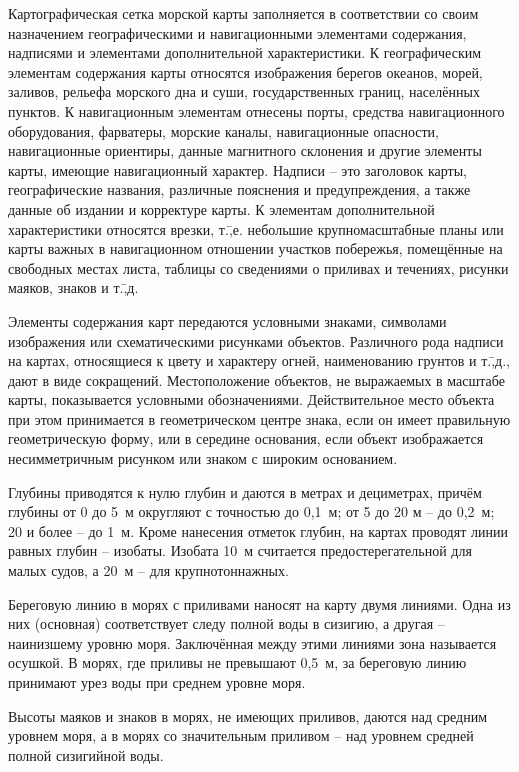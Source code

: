 Картографическая сетка морской карты заполняется в соответствии со
своим назначением географическими и навигационными элементами
содержания, надписями и элементами дополнительной характеристики. К
географическим элементам содержания карты относятся изображения
берегов океанов, морей, заливов, рельефа морского дна и суши,
государственных границ, населённых пунктов. К навигационным элементам
отнесены порты, средства навигационного оборудования, фарватеры,
морские каналы, навигационные опасности, навигационные ориентиры,
данные магнитного склонения и другие элементы карты, имеющие
навигационный характер. Надписи \--- это заголовок карты,
географические названия, различные пояснения и предупреждения, а также
данные об издании и корректуре карты. К элементам дополнительной
характеристики относятся врезки, т.\=,е. небольшие крупномасштабные
планы или карты важных в навигационном отношении участков побережья,
помещённые на свободных местах листа, таблицы со сведениями о приливах
и течениях, рисунки маяков, знаков и т.\=,д.
 
Элементы содержания карт передаются условными знаками, символами
изображения или схематическими рисунками объектов. Различного рода
надписи на картах, относящиеся к цвету и характеру огней, наименованию
грунтов и т.\=,д., дают в виде сокращений. Местоположение объектов, не
выражаемых в масштабе карты, показывается условными
обозначениями. Действительное место объекта при этом принимается в
геометрическом центре знака, если он имеет правильную геометрическую
форму, или в середине основания, если объект изображается
несимметричным рисунком или знаком с широким основанием.

Глубины приводятся к нулю глубин и даются в метрах и дециметрах,
причём глубины от 0 до 5~м округляют с точностью до 0,1~м; от 5 до 20
м \--- до 0,2~м; 20 и более \--- до 1~м. Кроме нанесения отметок
глубин, на картах проводят линии равных глубин \--- изобаты. Изобата
10~м считается предостерегательной для малых судов, а 20~м \--- для
крупнотоннажных.

Береговую линию в морях с приливами наносят на карту двумя
линиями. Одна из них (основная) соответствует следу полной воды в
сизигию, а другая \--- наинизшему уровню моря. Заключённая между этими
линиями зона называется осушкой. В морях, где приливы не превышают
0,5~м, за береговую линию принимают урез воды при среднем уровне моря.

Высоты маяков и знаков в морях, не имеющих приливов, даются над
средним уровнем моря, а в морях со значительным приливом \--- над
уровнем средней полной сизигийной воды.

